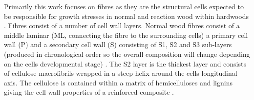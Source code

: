 Primarily this work focuses on fibres as they are the structural cells expected
to be responsible for growth stresses in normal and reaction wood within
hardwoods \cite{archer1987growth}. Fibres consist of a number of cell wall layers. Normal wood fibres
consist of a middle laminar (ML, connecting the fibre to
the surrounding cells) a primary cell wall (P) and a secondary cell wall (S) consisting of
S1, S2 and S3 sub-layers (produced in chronological order so the overall composition
will change depending on the cells developmental stage) \cite{barnett1981xylem}. The S2 layer is
the thickest layer and consists of cellulose macrofibrils wrapped in a steep helix
around the cells longitudinal axis. The cellulose is contained within a
matrix of hemicelluloses and lignins giving the cell wall properties
of a reinforced composite \cite{niklas2012plant}.